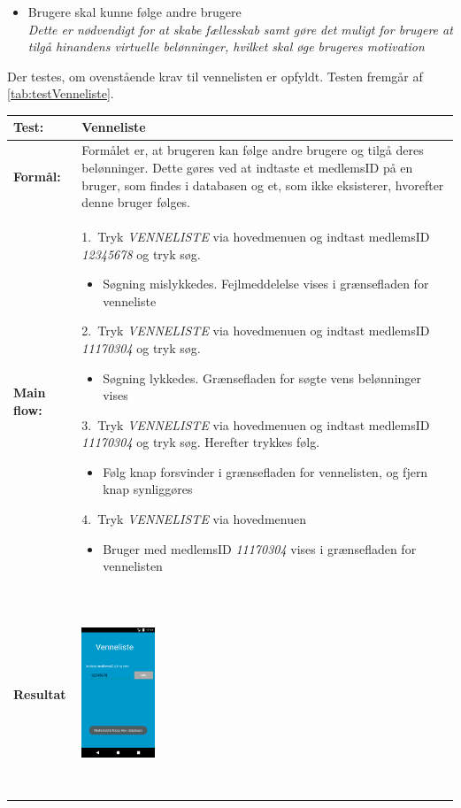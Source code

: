\begin{itemize}
\item Brugere skal kunne følge andre brugere
\\
\textit{Dette er nødvendigt for at skabe fællesskab samt gøre det muligt for brugere at tilgå hinandens virtuelle belønninger, hvilket skal øge brugeres motivation}
\end{itemize}

\noindent
Der testes, om ovenstående krav til vennelisten er opfyldt. Testen fremgår af \autoref{tab:testVenneliste}.

  \begin{longtable}{ | l | p{13cm} |} \hline
    \textbf{Test:} & Venneliste \\ \hline
  \textbf{Formål:} & Formålet er, at brugeren kan følge andre brugere og tilgå deres belønninger. Dette gøres ved at indtaste et medlemsID på en bruger, som findes i databasen og et, som ikke eksisterer, hvorefter denne bruger følges.
 \\ \hline
 	\textbf{Main flow:} & 1.~Tryk \textit{VENNELISTE} via hovedmenuen og indtast medlemsID \textit{12345678} og tryk søg.  
 	\begin{itemize}
 	\item Søgning mislykkedes. Fejlmeddelelse vises i grænsefladen for venneliste
 	\end{itemize}	
 	2.~Tryk \textit{VENNELISTE} via hovedmenuen og indtast medlemsID \textit{11170304} og tryk søg.
 	\begin{itemize}
 	\item Søgning lykkedes. Grænsefladen for søgte vens belønninger vises
	\end{itemize}
  3.~Tryk \textit{VENNELISTE} via hovedmenuen og indtast medlemsID \textit{11170304} og tryk søg. Herefter trykkes følg.
  \begin{itemize}
  \item  Følg knap forsvinder i grænsefladen for vennelisten, og fjern knap synliggøres
  \end{itemize}
  4.~Tryk \textit{VENNELISTE} via hovedmenuen
  \begin{itemize}
  \item Bruger med medlemsID \textit{11170304} vises i grænsefladen for vennelisten
  \end{itemize} \hspace{0.2mm}\\ \hline
\textbf{Resultat} & \hspace{0.3mm} \raisebox{-\totalheight}    {\includegraphics[width=0.20\textwidth, height=60mm]{figures/test/vennelisteny}} 

\end{longtable}
